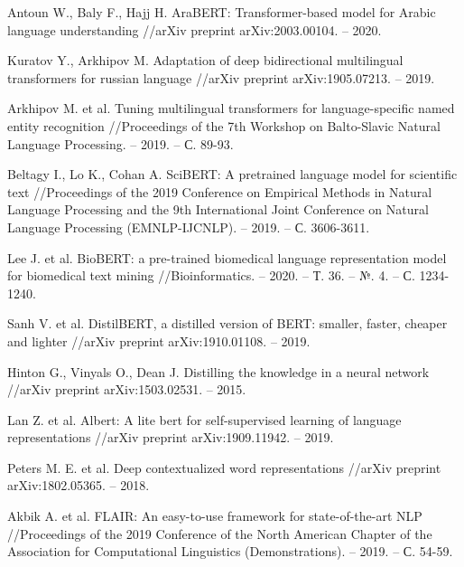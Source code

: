 \begin{thebibliography}{00}
    Antoun W., Baly F., Hajj H. AraBERT: Transformer-based model for Arabic language understanding //arXiv preprint arXiv:2003.00104. – 2020.
    
    Kuratov Y., Arkhipov M. Adaptation of deep bidirectional multilingual transformers for russian language //arXiv preprint arXiv:1905.07213. – 2019.
    
    Arkhipov M. et al. Tuning multilingual transformers for language-specific named entity recognition //Proceedings of the 7th Workshop on Balto-Slavic Natural Language Processing. – 2019. – С. 89-93.
    
    Beltagy I., Lo K., Cohan A. SciBERT: A pretrained language model for scientific text //Proceedings of the 2019 Conference on Empirical Methods in Natural Language Processing and the 9th International Joint Conference on Natural Language Processing (EMNLP-IJCNLP). – 2019. – С. 3606-3611.
    
    Lee J. et al. BioBERT: a pre-trained biomedical language representation model for biomedical text mining //Bioinformatics. – 2020. – Т. 36. – №. 4. – С. 1234-1240.
    
    Sanh V. et al. DistilBERT, a distilled version of BERT: smaller, faster, cheaper and lighter //arXiv preprint arXiv:1910.01108. – 2019.
    
    Hinton G., Vinyals O., Dean J. Distilling the knowledge in a neural network //arXiv preprint arXiv:1503.02531. – 2015.
    
    Lan Z. et al. Albert: A lite bert for self-supervised learning of language representations //arXiv preprint arXiv:1909.11942. – 2019.
    
    Peters M. E. et al. Deep contextualized word representations //arXiv preprint arXiv:1802.05365. – 2018.
    
    Akbik A. et al. FLAIR: An easy-to-use framework for state-of-the-art NLP //Proceedings of the 2019 Conference of the North American Chapter of the Association for Computational Linguistics (Demonstrations). – 2019. – С. 54-59.
    

\end{thebibliography}
\endgroup

\clearpage

